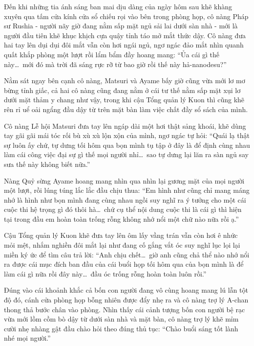\documentclass[../main.tex]{subfiles}
\begin{document}
\ct

Đến khi những tia ánh sáng ban mai dịu dàng của ngày hôm sau khẽ khàng xuyên qua tấm cửa kính cửa sổ chiếu rọi vào bên trong phòng họp, cô nàng Pháp sư Rushia - người nãy giờ đang nằm sấp mặt ngủ sải lai dưới sàn nhà - mới là người đầu tiên khẽ khục khịch cựa quậy tỉnh táo mở mắt thức dậy. Cô nàng đưa hai tay lên dụi dụi đôi mắt vẫn còn hơi ngái ngủ, ngơ ngác đảo mắt nhìn quanh quất khắp phòng một lượt rồi lẩm bẩm đầy hoang mang: ``Ủa cái gì thế này\dots\ mới đó mà trời đã sáng rực rỡ từ bao giờ rồi thế này hả-nanodesu?''


Nằm sát ngay bên cạnh cô nàng, Matsuri và Ayame bấy giờ cũng vừa mới lơ mơ bừng tỉnh giấc, cả hai cô nàng cũng đang nằm ở cái tư thế nằm sấp mặt xụi lơ dưới mặt thảm y chang như vậy, trong khi cậu Tổng quản lý Kuon thì cũng khẽ rên rỉ uể oải ngẩng đầu dậy từ trên mặt bàn làm việc chất đầy sổ sách của mình.

Cô nàng Lễ hội Matsuri đưa tay lên ngáp dài một hơi thật sảng khoái, khẽ dùng tay gãi gãi mái tóc rối bù xù xù lộn xộn của mình, ngơ ngác tự hỏi: ``Quái lạ thật sự luôn ấy chứ, tự dưng tối hôm qua bọn mình tụ tập ở đây là để định cùng nhau làm cái công việc đại sự gì thế mọi người nhỉ\dots\ sao tự dưng lại lăn ra sàn ngủ say sưa thế này không biết nữa.''

Nàng Quỷ sừng Ayame hoang mang nhìn qua nhìn lại gương mặt của mọi người một lượt, rồi lúng túng lắc lắc đầu chịu thua: ``Em hình như cũng chỉ mang máng nhớ là hình như bọn mình đang cùng nhau ngồi suy nghĩ ra ý tưởng cho một cái cuộc thi hệ trọng gì đó thôi hà\dots\ chứ cụ thể nội dung cuộc thi là cái gì thì hiện tại trong đầu em hoàn toàn trống rỗng không nhớ nổi một chữ nào nữa rồi ạ.''

Cậu Tổng quản lý Kuon khẽ đưa tay lên ôm lấy vầng trán vẫn còn hơi ê nhức mỏi mệt, nhắm nghiền đôi mắt lại như đang cố gắng vắt óc suy nghĩ lục lọi lại miền ký ức để tìm câu trả lời: ``Anh chịu chết\dots\ giờ anh cũng chả thể nào nhớ nổi ra được cái mục đích ban đầu của cái buổi họp tối hôm qua của bọn mình là để làm cái gì nữa rồi đây này\dots\ đầu óc trống rỗng hoàn toàn luôn rồi.''

Đúng vào cái khoảnh khắc cả bốn con người đang vô cùng hoang mang lú lẫn tột độ đó, cánh cửa phòng họp bỗng nhiên được đẩy nhẹ ra và cô nàng trợ lý A-chan thong thả bước chân vào phòng. Nhìn thấy cái cảnh tượng bốn con người bệ rạc vừa mới lồm cồm bò dậy từ dưới sàn nhà và mặt bàn, cô nàng trợ lý khẽ mỉm cười nhẹ nhàng gật đầu chào hỏi theo đúng thủ tục: ``Chào buổi sáng tốt lành nhé mọi người.''
\end{document}
